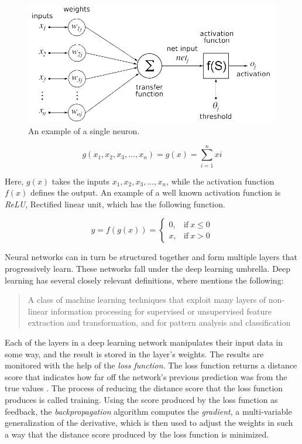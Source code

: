 \documentclass[nofilelist]{cslthse-msc}
\begin{document}
\begin{figure}[htp]
    \centering
    \includegraphics[width=12cm]{msccls/explanatory_images/single_neuron.png}
    \caption{An example of a single neuron.}
    \label{fig:neuron}
\end{figure}


\begin{equation}
    g(x_1, x_2, x_3,...,x_n) = g(x) = \sum_{i=1}^n  xi
\end{equation}

Here, $g(x)$ takes the inputs $x_1, x_2, x_3,...,x_n$, while the activation function $f(x)$ defines the output. An example of a well known activation function is \textit{ReLU}, Rectified linear unit, which has the following function. 

\begin{equation}
y = f(g(x)) =
\begin{cases}
  0, & \text{if}\ x \leq 0 \\
  x, & \text{if}\ x > 0
\end{cases}
\end{equation}

Neural networks can in turn be structured together and form multiple layers that progressively learn. These networks fall under the deep learning umbrella. Deep learning has several closely relevant definitions, where \citet{deng2014deep} mentions the following:

\begin{quote}{A class of machine learning techniques that exploit many layers of non-linear information processing for supervised or unsupervised feature extraction and transformation, and for pattern analysis and classification}
\end{quote}

Each of the layers in a deep learning network manipulates their input data in some way, and the result is stored in the layer's weights. The results are monitored with the help of the \textit{loss function}. The loss function returns a distance score that indicates how far off the network's previous prediction was from the true values \citep{franoischollet2017learning}. The process of reducing the distance score that the loss function produces is called training. 
Using the score produced by the loss function as feedback, the \textit{backpropagation} algorithm computes the \textit{gradient}, a multi-variable generalization of the derivative, which is then used to adjust the weights in such a way that the distance score produced by the loss function is minimized. 
\end{document}
